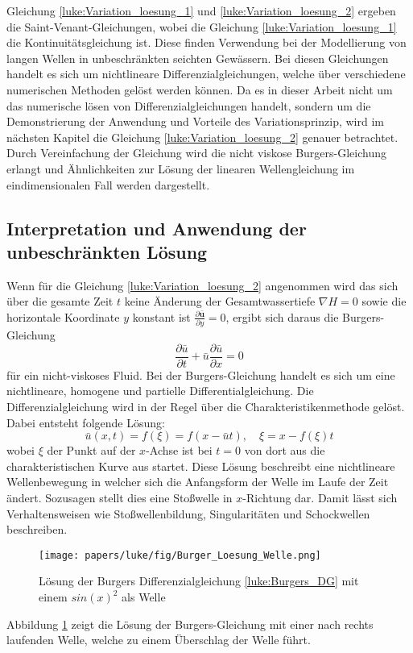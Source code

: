 Gleichung \eqref{luke:Variation_loesung_1} und \eqref{luke:Variation_loesung_2} ergeben die Saint-Venant-Gleichungen, wobei die Gleichung \eqref{luke:Variation_loesung_1} die Kontinuitätsgleichung ist.
Diese finden Verwendung bei der Modellierung von langen Wellen in unbeschränkten seichten Gewässern.
Bei diesen Gleichungen handelt es sich um nichtlineare Differenzialgleichungen, welche über verschiedene numerischen Methoden gelöst werden können.
Da es in dieser Arbeit nicht um das numerische lösen von Differenzialgleichungen handelt, sondern um die Demonstrierung der Anwendung und Vorteile des Variationsprinzip, wird im nächsten Kapitel die Gleichung \eqref{luke:Variation_loesung_2} genauer betrachtet.
Durch Vereinfachung der Gleichung wird die nicht viskose Burgers-Gleichung erlangt und Ähnlichkeiten zur Lösung der linearen Wellengleichung im eindimensionalen Fall werden dargestellt.

\subsection{Interpretation und Anwendung der unbeschränkten Lösung}
Wenn für die Gleichung \eqref{luke:Variation_loesung_2} angenommen wird das sich über die gesamte Zeit $t$ keine Änderung der Gesamtwassertiefe $ \nabla H = 0 $ sowie die horizontale Koordinate $y$ konstant ist $\frac{\partial \bar{\bm{u}}}{\partial y} = 0$, ergibt sich daraus die Burgers-Gleichung
\begin{equation}
	\frac{\partial \bar{u}}{\partial t} + \bar{u} \frac{\partial \bar{u}}{\partial x} = 0
	\label{luke:Burgers_DG}
\end{equation}
für ein nicht-viskoses Fluid.
Bei der Burgers-Gleichung handelt es sich um eine nichtlineare, homogene und partielle Differentialgleichung.
Die Differenzialgleichung wird in der Regel über die Charakteristikenmethode gelöst. 
Dabei entsteht folgende Lösung:
\[
\bar{u}(x,t) = f(\xi) = f(x-\bar{u}t),\quad \xi = x-f(\xi)t
\]
wobei $\xi$ der Punkt auf der $x$-Achse ist bei $t = 0$ von dort aus die charakteristischen Kurve aus startet.
Diese Lösung beschreibt eine nichtlineare Wellenbewegung in welcher sich die Anfangsform der Welle im Laufe der Zeit ändert.
Sozusagen stellt dies eine Stoßwelle in $x$-Richtung dar.
Damit lässt sich Verhaltensweisen wie Stoßwellenbildung, Singularitäten und Schockwellen beschreiben.
\begin{figure}
	\texttt{[image: papers/luke/fig/Burger\_Loesung\_Welle.png]}
	\caption{Lösung der Burgers Differenzialgleichung \eqref{luke:Burgers_DG} mit einem $sin(x)^2$ als Welle
		\label{luke:fig:Loesung_Burgers}}
\end{figure}
Abbildung \ref{luke:fig:Loesung_Burgers} zeigt die Lösung der Burgers-Gleichung mit einer nach rechts laufenden Welle, welche zu einem Überschlag der Welle führt.

